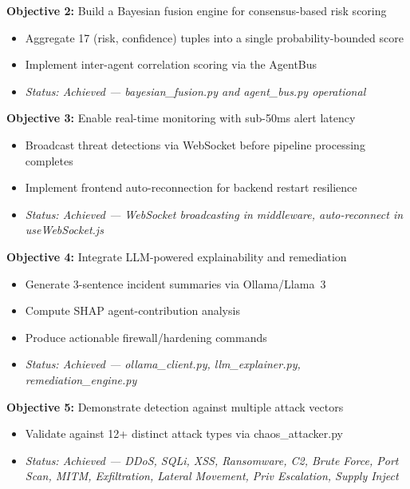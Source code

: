\documentclass[12pt, a4paper]{report}
\begin{document}
\noindent\textbf{Objective 2:} Build a Bayesian fusion engine for consensus-based risk scoring
\begin{itemize}
    \item Aggregate 17 (risk, confidence) tuples into a single probability-bounded score
    \item Implement inter-agent correlation scoring via the AgentBus
    \item \textit{Status: Achieved — bayesian\_fusion.py and agent\_bus.py operational}
\end{itemize}

\noindent\textbf{Objective 3:} Enable real-time monitoring with sub-50ms alert latency
\begin{itemize}
    \item Broadcast threat detections via WebSocket before pipeline processing completes
    \item Implement frontend auto-reconnection for backend restart resilience
    \item \textit{Status: Achieved — WebSocket broadcasting in middleware, auto-reconnect in useWebSocket.js}
\end{itemize}

\noindent\textbf{Objective 4:} Integrate LLM-powered explainability and remediation
\begin{itemize}
    \item Generate 3-sentence incident summaries via Ollama/Llama~3
    \item Compute SHAP agent-contribution analysis
    \item Produce actionable firewall/hardening commands
    \item \textit{Status: Achieved — ollama\_client.py, llm\_explainer.py, remediation\_engine.py}
\end{itemize}

\noindent\textbf{Objective 5:} Demonstrate detection against multiple attack vectors
\begin{itemize}
    \item Validate against 12+ distinct attack types via chaos\_attacker.py
    \item \textit{Status: Achieved — DDoS, SQLi, XSS, Ransomware, C2, Brute Force, Port Scan, MITM, Exfiltration, Lateral Movement, Priv Escalation, Supply Inject}
\end{itemize}


\end{document}
